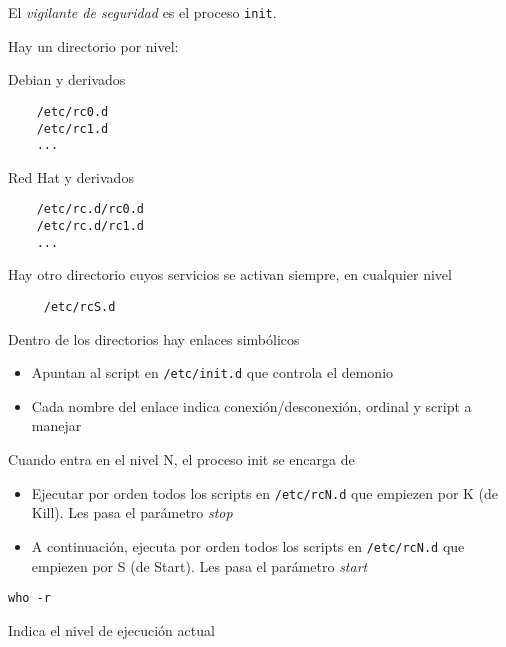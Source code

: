 \documentclass[ucs]{beamer}
\begin{document}
\begin{frame}[fragile]

El \emph{vigilante de seguridad} es el proceso \verb|init|.  

Hay un directorio por nivel:

Debian y derivados
\begin{scriptsize}
    \begin{verbatim}
    /etc/rc0.d
    /etc/rc1.d
    ...
\end{verbatim}
\end{scriptsize}

Red Hat y derivados
\begin{scriptsize}
\begin{verbatim}
    /etc/rc.d/rc0.d
    /etc/rc.d/rc1.d
    ...
\end{verbatim}
\end{scriptsize}


Hay otro directorio cuyos servicios se activan siempre, en cualquier nivel

\begin{scriptsize}
    \begin{verbatim}
     /etc/rcS.d
\end{verbatim}
\end{scriptsize}

\end{frame}

\begin{frame}[fragile]

Dentro de los directorios hay enlaces simbólicos
\begin{itemize}
\item
Apuntan al script en \verb|/etc/init.d| que controla el demonio
\item
Cada nombre del enlace indica conexión/desconexión, ordinal y script a manejar
\end{itemize}

Cuando entra en el nivel N, el proceso init se encarga de

\begin{itemize}

\item Ejecutar por orden
todos los scripts en \verb|/etc/rcN.d| que empiezen por K (de Kill).
Les pasa el parámetro \emph{stop}

\item A continuación, ejecuta por orden
todos los scripts en \verb|/etc/rcN.d| que empiezen por S (de Start). 
Les pasa
el parámetro \emph{start}




\end{itemize}
\begin{verbatim}
who -r
\end{verbatim}
Indica el nivel de ejecución actual
\end{frame}
\end{document}

